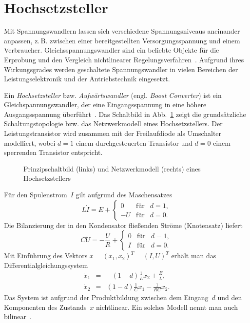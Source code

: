 \section{Hochsetzsteller\label{subsec:Hochsetzsteller-Modellierung}}

Mit Spannungswandlern lassen sich verschiedene Spannungsniveaus aneinander
anpassen, z.\,B. zwischen einer bereitgestellten Versorgungsspannung
und einem Verbraucher. Gleichsspannungswandler sind ein beliebte Objekte
für die Erprobung und den Vergleich nichtlinearer Regelungsverfahren~\cite{sira-ramirez1991ijc,kugi2000at,gensior2006}.
Aufgrund ihres Wirkungsgrades werden geschaltete Spannungswandler
in vielen Bereichen der Leistungselektronik und der Antriebstechnik
eingesetzt.

Ein \emph{Hochsetzsteller} bzw. \emph{Aufwärtswandler}
(engl. \emph{Boost Converter}) ist ein Gleichspannungswandler, der
eine Eingangsspannung in eine höhere Ausgangsspannung überführt~\cite{erickson2004,bacha2014}.
Das Schaltbild in Abb.~\ref{fig:hochsetzsteller-schaltbild-netzwerk}
zeigt die grundsätzliche Schaltungstopologie bzw. das Netzwerkmodell
eines Hochsetzstellers. Der Leistungstransistor wird zusammen mit
der Freilaufdiode als Umschalter modelliert, wobei $d=1$ einem durchgesteuerten
Transistor und $d=0$ einem sperrenden Transistor entspricht. 

\begin{figure}
\begin{centering}
\resizebox{0.99\textwidth}{!}{}
\par\end{centering}
\caption{Prinzipschaltbild (links) und Netzwerkmodell (rechts) eines Hochsetzstellers\label{fig:hochsetzsteller-schaltbild-netzwerk}}

\end{figure}
Für den Spulenstrom~$I$ gilt aufgrund des Maschensatzes 
\[
L\dot{I}=E+\left\{ \begin{array}{rcl}
0 & \text{für} & d=1,\\
-U & \text{für} & d=0.
\end{array}\right.
\]
Die Bilanzierung der in den Kondensator fließenden Ströme (Knotensatz)
liefert 
\[
C\dot{U}=-\frac{U}{R}+\left\{ \begin{array}{rcl}
0 & \text{für} & d=1,\\
I & \text{für} & d=0.
\end{array}\right.
\]
Mit Einführung des Vektors $x=(x_{1},x_{2})^{T}=(I,U)^{T}$ erhält
man das Differentialgleichungssystem 
\begin{equation}
\begin{array}{lcl}
\dot{x}_{1} & = & -(1-d)\frac{1}{L}x_{2}+\frac{E}{L},\\
\dot{x}_{2} & = & (1-d)\frac{1}{C}x_{1}-\frac{1}{RC}x_{2}.
\end{array}\label{eq:Hochsetzsteller-modell}
\end{equation}
Das System ist aufgrund der Produktbildung zwischen dem Eingang~$d$
und den Komponenten des Zustands~$x$ nichtlinear. Ein solches Modell
nennt man auch bilinear~\cite{schwarz91}.


